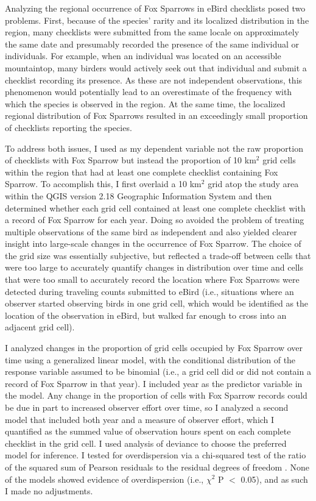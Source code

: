 \documentclass[fleqn,10pt,lineno]{wlpeerj} %
\begin{document}
Analyzing the regional occurrence of Fox Sparrows in eBird checklists posed two problems. First, because of the species’ rarity and its localized distribution in the region, many checklists were submitted from the same locale on approximately the same date and presumably recorded the presence of the same individual or individuals. For example, when an individual was located on an accessible mountaintop, many birders would actively seek out that individual and submit a checklist recording its presence. As these are not independent observations, this phenomenon would potentially lead to an overestimate of the frequency with which the species is observed in the region. At the same time, the localized regional distribution of Fox Sparrows resulted in an exceedingly small proportion of checklists reporting the species. 

To address both issues, I used as my dependent variable not the raw proportion of checklists with Fox Sparrow but instead the proportion of 10 km$^{2}$ grid cells within the region that had at least one complete checklist containing Fox Sparrow. To accomplish this, I first overlaid a 10 km$^{2}$ grid atop the study area within the QGIS version 2.18 Geographic Information System \citep{QGIS_Development_Team2016-iw} and then determined whether each grid cell contained at least one complete checklist with a record of Fox Sparrow for each year. Doing so avoided the problem of treating multiple observations of the same bird as independent and also yielded clearer insight into large-scale changes in the occurrence of Fox Sparrow. The choice of the grid size was essentially subjective, but reflected a trade-off between cells that were too large to accurately quantify changes in distribution over time and cells that were too small to accurately record the location where Fox Sparrows were detected during traveling counts submitted to eBird (i.e., situations where an observer started observing birds in one grid cell, which would be identified as the location of the observation in eBird, but walked far enough to cross into an adjacent grid cell). 

I analyzed changes in the proportion of grid cells occupied by Fox Sparrow over time using a generalized linear model, with the conditional distribution of the response variable assumed to be binomial (i.e., a grid cell did or did not contain a record of Fox Sparrow in that year). I included year as the predictor variable in the model. Any change in the proportion of cells with Fox Sparrow records could be due in part to increased observer effort over time, so I analyzed a second model that included both year and a measure of observer effort, which I quantified as the summed value of observation hours spent on each complete checklist in the grid cell. I used analysis of deviance to choose the preferred model for inference. I tested for overdispersion via a chi-squared test of the ratio of the squared sum of Pearson residuals to the residual degrees of freedom \citep{Venables2002-gt}. None of the models showed evidence of overdispersion (i.e., $\chi^2$ P ${<}$ 0.05), and as such I made no adjustments. 
\end{document}
